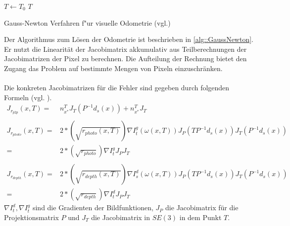 \documentclass[12pt,DIV=15,BCOR=15mm,twoside,headsepline,abstract=true,listof=totoc,bibliography=totoc]{scrreprt}
\theoremstyle{remark}    %
\begin{document}
    \begin{algorithm}[t]
        \SetAlgoLined
        $T \gets T_0$\;
        \Return $T$\;
        \caption{Gauss-Newton Verfahren f"ur  visuelle Odometrie (vgl.\cite[Kap.8.4]{Absil2008}\cite{Zhou2018,Park_2017_ICCV})}\label{alg::GaussNewton}
    \end{algorithm} \noindent
    Der Algorithmus zum Lösen der Odometrie ist beschrieben in \ref{alg::GaussNewton}. Er nutzt die Linearität der Jacobimatrix akkumulativ aus Teilberechnungen
    der Jacobimatrizen der Pixel zu berechnen. Die Aufteilung der Rechnung bietet den Zugang das Problem auf bestimmte Mengen von Pixeln einzuschränken.\\\\
    Die konkreten Jacobimatrizen für die Fehler sind gegeben durch folgenden Formeln (vgl. \cite[S.146, Fom.28-30]{Park_2017_ICCV}). 
    \begin{align*}
        \label{jacobian}
        J_{r_{p2p}}(x,T)=&n_{x^*}^{T}J_T(P^{-1}d_s(x))+ n_{x^*}^{T}J_T \\\\
        J_{r_{photo}}(x,T)=&2*\left(\sqrt{r_{photo}(x,T)}\right)\nabla I_t^g(\omega(x,T)) J_P(TP^{-1}d_s(x)) J_T(P^{-1}d_s(x))\\
                         =&2*\left(\sqrt{r_{photo}}\right)\nabla I_t^g J_P J_T\\\\
        J_{r_{depth}}(x,T)=&2*\left(\sqrt{r_{depth}(x,T)}\right)\nabla I_s^d(\omega(x,T)) J_P(TP^{-1}d_s(x)) J_T(P^{-1}d_s(x))\\
                        =&2*\left(\sqrt{r_{depth}}\right)\nabla I_t^dJ_PJ_T
    \end{align*}
    $\nabla I_t^d,\nabla I_t^g$ sind die Gradienten der Bildfunktionen, $J_P$ die Jacobimatrix für die Projektionsmatrix $P$ und $J_T$ die Jacobimatrix 
    in $SE(3)$ in dem Punkt $T$.\\\\
\end{document}
